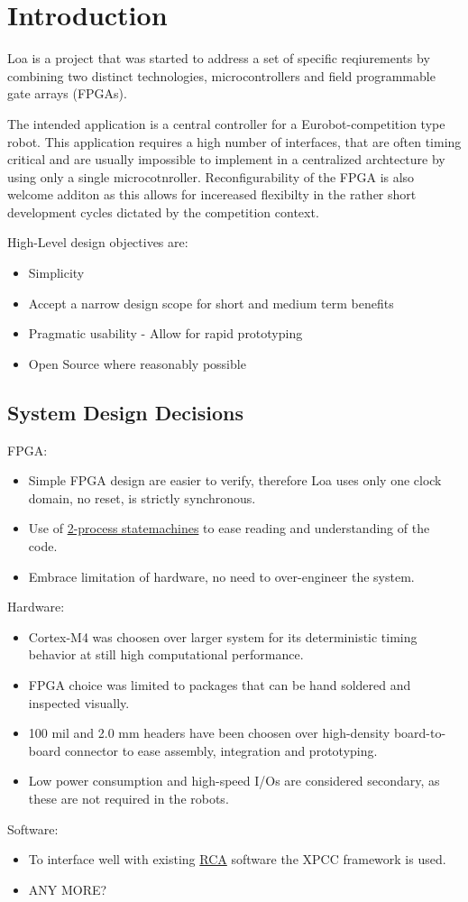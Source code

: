 \chapter{Introduction}

Loa is a project that was started to address a set of specific reqiurements by combining two distinct technologies, microcontrollers and field pro\-gramm\-able gate arrays (FPGAs).

The intended application is a central controller for a Eurobot-competition type robot. This application requires a high number of interfaces, that are often timing critical and 
are usually impossible to implement in a centralized archtecture by using only a single microcotnroller. Reconfigurability of the FPGA is also welcome additon as this allows 
for incereased flexibilty in the rather short development cycles dictated by the competition context.

High-Level design objectives are:

\begin{itemize}
\item Simplicity 
\item Accept a narrow design scope for short and medium term benefits
\item Pragmatic usability - Allow for rapid prototyping
\item Open Source where reasonably possible
\end{itemize}



\section{System Design Decisions}

FPGA:
\begin{itemize}
\item Simple FPGA design are easier to verify, therefore Loa uses only one clock domain, no reset, is strictly synchronous.
\item Use of \href{http://www.gaisler.com/doc/vhdl2proc.pdf}{2-process statemachines} to ease reading and understanding of the code.
\item Embrace limitation of hardware, no need to over-engineer the system. 
\end{itemize}

Hardware:
\begin{itemize}
\item Cortex-M4 was choosen over larger system for its deterministic timing behavior at still high computational performance.
\item FPGA choice was limited to packages that can be hand soldered and inspected visually.
\item 100 mil and 2.0 mm headers have been choosen over high-density board-to-board connector to ease assembly, integration and prototyping.
\item Low power consumption and high-speed I/Os are considered secondary, as these are not required in the robots.
\end{itemize}


Software:
\begin{itemize}
\item To interface well with existing \href{http://www.roboterclub.rwth-aachen.de}{RCA} software the XPCC framework is used.
\item ANY MORE?
\end{itemize}





